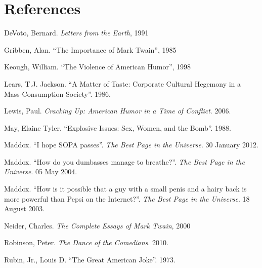 \section*{References}

\bibent DeVoto, Bernard. \textit{Letters from the Earth}, 1991

\bibent Gribben, Alan. ``The Importance of Mark Twain'', 1985

\bibent Keough, William. ``The Violence of American Humor'', 1998

\bibent Lears, T.J. Jackson. ``A Matter of Taste: Corporate Cultural Hegemony in a Mass-Consumption Society''. 1986.

\bibent Lewis, Paul. \textit{Cracking Up: American Humor in a Time of Conflict}. 2006.

\bibent May, Elaine Tyler. ``Explosive Issues: Sex, Women, and the Bomb''. 1988.

\bibent Maddox. ``I hope SOPA passes''. \textit{The Best Page in the Universe}. 30 January 2012.

\bibent Maddox. ``How do you dumbasses manage to breathe?''. \textit{The Best Page in the Universe}. 05 May 2004.

\bibent Maddox. ``How is it possible that a guy with a small penis and a hairy back is more powerful than Pepsi on the Internet?''. \textit{The Best Page in the Universe}. 18 August 2003.

\bibent Neider, Charles. \textit{The Complete Essays of Mark Twain}, 2000

\bibent Robinson, Peter. \textit{The Dance of the Comedians}. 2010.

\bibent Rubin, Jr., Louis D. ``The Great American Joke''. 1973.
